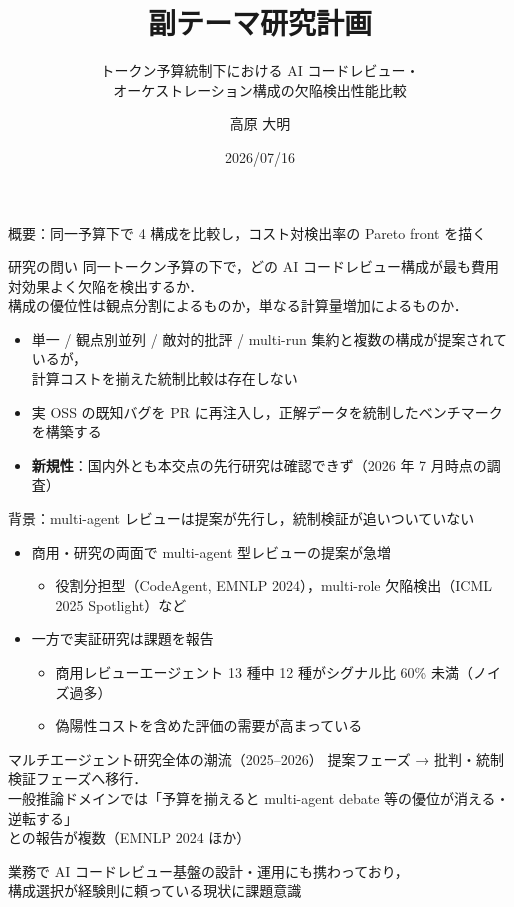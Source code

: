\documentclass[10pt, aspectratio=169, t]{beamer}
\title{副テーマ研究計画}
\subtitle{トークン予算統制下における AI コードレビュー・\\オーケストレーション構成の欠陥検出性能比較}
\date{2026/07/16}
\author{高原 大明}
\institute{}
\begin{document}
\maketitle

\begin{frame}{概要：同一予算下で 4 構成を比較し，コスト対検出率の Pareto front を描く}
    \begin{block}{研究の問い}
        同一トークン予算の下で，どの AI コードレビュー構成が最も費用対効果よく欠陥を検出するか．\\
        構成の優位性は\alert{観点分割}によるものか，単なる\alert{計算量増加}によるものか．
    \end{block}
    \vspace{4pt}
    \begin{itemize}
        \item 単一 / 観点別並列 / 敵対的批評 / multi-run 集約と複数の構成が提案されているが，\\
        \alert{計算コストを揃えた統制比較は存在しない}
        \item 実 OSS の既知バグを PR に再注入し，正解データを統制したベンチマークを構築する
        \item \textbf{新規性}：国内外とも本交点の先行研究は確認できず（2026 年 7 月時点の調査）
    \end{itemize}
\end{frame}

\begin{frame}{背景：multi-agent レビューは提案が先行し，統制検証が追いついていない}
    \begin{itemize}
        \item 商用・研究の両面で multi-agent 型レビューの提案が急増
        \begin{itemize}
            \item 役割分担型（CodeAgent, EMNLP 2024），multi-role 欠陥検出（ICML 2025 Spotlight）など
        \end{itemize}
        \item 一方で実証研究は課題を報告
        \begin{itemize}
            \item 商用レビューエージェント 13 種中 12 種がシグナル比 60\% 未満（\alert{ノイズ過多}）
            \item 偽陽性コストを含めた評価の需要が高まっている
        \end{itemize}
    \end{itemize}
    \begin{block}{マルチエージェント研究全体の潮流（2025--2026）}
        提案フェーズ → \alert{批判・統制検証フェーズ}へ移行．\\
        一般推論ドメインでは「予算を揃えると multi-agent debate 等の優位が消える・逆転する」\\
        との報告が複数（EMNLP 2024 ほか）
    \end{block}
    \vspace{5pt}
    業務で AI コードレビュー基盤の設計・運用にも携わっており，\\
    構成選択が\alert{経験則に頼っている}現状に課題意識
\end{frame}
\end{document}
